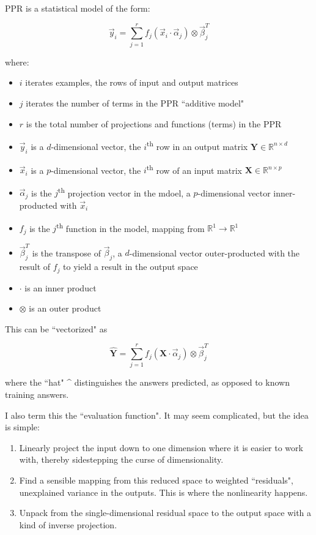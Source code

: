 \documentclass[12pt]{article}
\begin{document}
PPR is a statistical model of the form:

$$\vec{y}_i = \sum_{j=1}^{r} f_j(\vec{x}_i \cdot \vec{\alpha}_j) \otimes \vec{\beta}_j^T$$

where:
\begin{itemize}
	\setlength\itemsep{-2mm}
	\item $i$ iterates examples, the rows of input and output matrices
	\item $j$ iterates the number of terms in the PPR ``additive model"
	\item $r$ is the total number of projections and functions (terms) in the PPR
	\item $\vec{y}_i$ is a $d$-dimensional vector, the $i$\textsuperscript{th} row in an output matrix $\pmb{Y} \in \mathbb{R}^{n \times d}$
	\item $\vec{x}_i$ is a $p$-dimensional vector, the $i$\textsuperscript{th} row of an input matrix $\pmb{X} \in \mathbb{R}^{n \times p}$
	\item $\vec{\alpha}_j$ is the $j$\textsuperscript{th} projection vector in the mdoel, a $p$-dimensional vector inner-producted with $\vec{x}_i$
	\item $f_j$ is the $j$\textsuperscript{th} function in the model, mapping from $\mathbb{R}^1 \rightarrow \mathbb{R}^1$
	\item $\vec{\beta}_j^T$ is the transpose of $\vec{\beta}_j$, a $d$-dimensional vector outer-producted with the result of $f_j$ to yield a result in the output space
	\item $\cdot$ is an inner product
	\item $\otimes$ is an outer product
\end{itemize}

This can be ``vectorized" as

$$\pmb{\hat{Y}} = \sum_{j=1}^r f_j(\pmb{X} \cdot \vec{\alpha}_j) \otimes \vec{\beta}_j^T$$

where the ``hat" \string^ distinguishes the answers predicted, as opposed to known training answers.\newline

I also term this the ``evaluation function". It may seem complicated, but the idea is simple:

\begin{enumerate}
	\setlength\itemsep{-2mm}
	\item Linearly project the input down to one dimension where it is easier to work with, thereby sidestepping the curse of dimensionality.
	\item Find a sensible mapping from this reduced space to weighted ``residuals", unexplained variance in the outputs. This is where the nonlinearity happens.
	\item Unpack from the single-dimensional residual space to the output space with a kind of inverse projection.
\end{enumerate}
\end{document}
